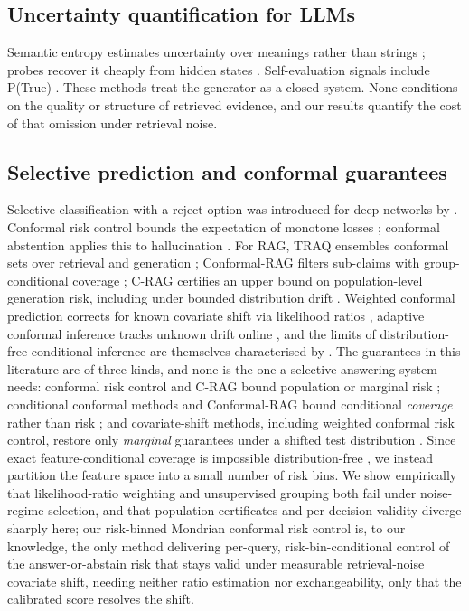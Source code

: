 \documentclass[sn-basic]{sn-jnl}
\theoremstyle{thmstyleone}
\theoremstyle{thmstyletwo}
\begin{document}
\subsection{Uncertainty quantification for LLMs}
Semantic entropy estimates uncertainty over meanings rather than
strings \citep{kuhn2023semantic,farquhar2024nature}; probes recover it
cheaply from hidden states \citep{kossen2024sep}. Self-evaluation signals include P(True) \citep{kadavath2022language}. These methods treat the
generator as a closed system. None conditions on the quality or
structure of retrieved evidence, and our results quantify the cost of
that omission under retrieval noise.

\subsection{Selective prediction and conformal guarantees}
Selective classification with a reject option was introduced for deep networks by \citet{geifman2017selective}. Conformal risk control bounds the
expectation of monotone losses \citep{angelopoulos2024crc}; conformal abstention applies this to hallucination \citep{abbasi2024conformalabstention}. For RAG, TRAQ ensembles
conformal sets over retrieval and generation \citep{li2024traq};
Conformal-RAG filters sub-claims with group-conditional coverage
\citep{feng2025conformalrag}; C-RAG certifies an upper bound on
population-level generation risk, including under bounded distribution
drift \citep{kang2024crag}. Weighted conformal prediction corrects for
known covariate shift via likelihood ratios
\citep{tibshirani2019covariate}, adaptive conformal inference tracks
unknown drift online \citep{gibbs2021aci}, and the limits of
distribution-free conditional inference are themselves characterised by
\citet{barber2021limits}.
The guarantees in this literature are of three kinds, and none is the one a
selective-answering system needs: conformal risk control and C-RAG bound
population or marginal risk \citep{angelopoulos2024crc,kang2024crag}; conditional
conformal methods and Conformal-RAG bound conditional \emph{coverage} rather than
risk \citep{gibbs2025conditional,feng2025conformalrag}; and covariate-shift
methods, including weighted conformal risk control, restore only \emph{marginal}
guarantees under a shifted test distribution
\citep{tibshirani2019covariate,gibbs2021aci,zecchin2025wcrc}. Since exact
feature-conditional coverage is impossible distribution-free
\citep{barber2021limits}, we instead partition the feature space into a small
number of risk bins. We show empirically that likelihood-ratio weighting and
unsupervised grouping both fail under noise-regime selection, and that population
certificates and per-decision validity diverge sharply here; our risk-binned
Mondrian conformal risk control is, to our knowledge, the only method delivering
per-query, risk-bin-conditional control of the answer-or-abstain risk that stays
valid under measurable retrieval-noise covariate shift, needing neither ratio
estimation nor exchangeability, only that the calibrated score resolves the shift.
\end{document}
